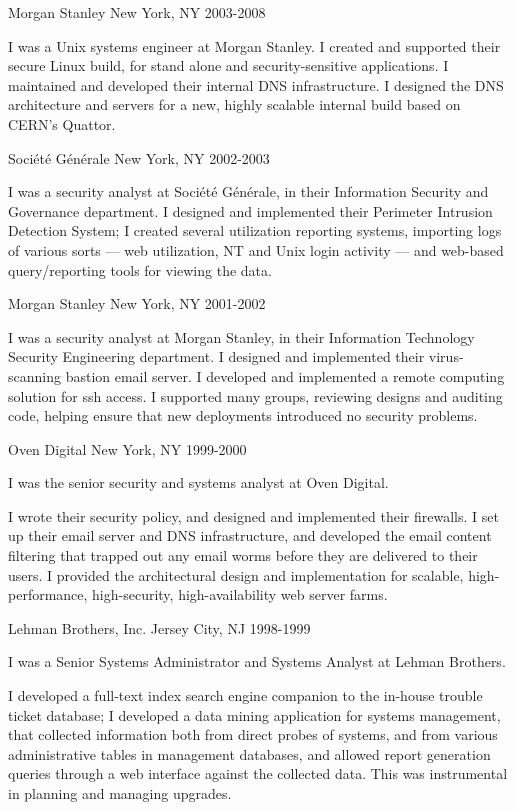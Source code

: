 \documentclass{article}
\begin{document}
Morgan Stanley \hfill New York, NY
2003-2008

I was a Unix systems engineer at Morgan Stanley. I created and
supported their secure Linux build, for stand alone and
security-sensitive applications. I maintained and developed their
internal DNS infrastructure. I designed the DNS architecture
and servers for a new, highly scalable internal build based on
CERN's Quattor.

Société Générale \hfill New York, NY
2002-2003

I was a security analyst at Société Générale, in their Information
Security and Governance department. I designed and implemented
their Perimeter Intrusion Detection System; I created several
utilization reporting systems, importing logs of various sorts
--- web utilization, NT and Unix login activity --- and web-based
query/reporting tools for viewing the data.

Morgan Stanley \hfill New York, NY
2001-2002

I was a security analyst at Morgan Stanley, in their Information
Technology Security Engineering department. I designed and
implemented their virus-scanning bastion email server. I developed
and implemented a remote computing solution for ssh access. I
supported many groups, reviewing designs and auditing code,
helping ensure that new deployments introduced no security
problems.

Oven Digital \hfill New York, NY
1999-2000

I was the senior security and systems analyst at Oven Digital.

I wrote their security policy, and designed and implemented their
firewalls.  I set up their email server and DNS infrastructure,
and developed the email content filtering that trapped out any
email worms before they are delivered to their users. I provided
the architectural design and implementation for scalable,
high-performance, high-security, high-availability web server
farms.

Lehman Brothers, Inc. \hfill Jersey City, NJ
1998-1999

I was a Senior Systems Administrator and Systems Analyst at Lehman
Brothers.

I developed a full-text index search engine companion to
the in-house trouble ticket database; I developed a data
mining application for systems management, that collected
information both from direct probes of systems, and from various
administrative tables in management databases, and allowed report
generation queries through a web interface against the collected
data. This was instrumental in planning and managing upgrades.
\end{document}

